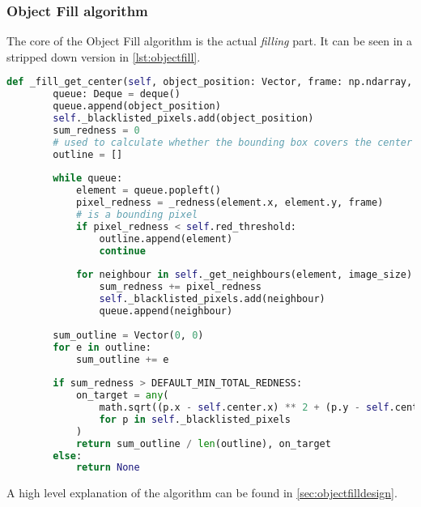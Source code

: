 \subsubsection{Object Fill algorithm}\label{solution:objfillalgo}

The core of the Object Fill algorithm is the actual \textit{filling} part.
It can be seen in a stripped down version in \autoref{lst:objectfill}.

\begin{lstlisting}[language=Python,label={lst:objectfill},caption={Stripped down version of object fill from object\_fill.py}]
	def _fill_get_center(self, object_position: Vector, frame: np.ndarray, image_size: Vector) -> Optional[Tuple[Vector,bool]]:
		queue: Deque = deque()
		queue.append(object_position)
		self._blacklisted_pixels.add(object_position)
		sum_redness = 0
		# used to calculate whether the bounding box covers the center
		outline = []
		
		while queue:
			element = queue.popleft()
			pixel_redness = _redness(element.x, element.y, frame)
			# is a bounding pixel
			if pixel_redness < self.red_threshold:
				outline.append(element)
				continue
			
			for neighbour in self._get_neighbours(element, image_size) - self._blacklisted_pixels:
				sum_redness += pixel_redness
				self._blacklisted_pixels.add(neighbour)
				queue.append(neighbour)
		
		sum_outline = Vector(0, 0)
		for e in outline:
			sum_outline += e
		
		if sum_redness > DEFAULT_MIN_TOTAL_REDNESS:
			on_target = any(
				math.sqrt((p.x - self.center.x) ** 2 + (p.y - self.center.y) ** 2) < self.fill_step_size
				for p in self._blacklisted_pixels
			)
			return sum_outline / len(outline), on_target
		else:
			return None

\end{lstlisting}

A high level explanation of the algorithm can be found in \autoref{sec:objectfilldesign}.